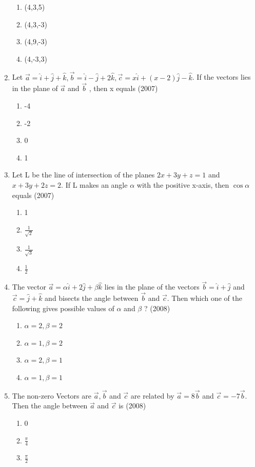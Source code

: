 \documentclass[12pt]{article}
\begin{document}
\begin{enumerate}
\begin{enumerate}
\item (4,3,5)
\item (4,3,-3)
\item (4,9,-3)
\item (4,-3,3)
\end{enumerate}
\item Let $\vec{a}=\hat{i}+\hat{j}+\hat{k},\vec{b}=\hat{i}-\hat{j}+2\hat{k},\vec{c}=x\hat{i}+(x-2)\hat{j}-\hat{k}$. If the vectors lies in the plane of $\vec{a}$ and $\vec{b}$ , then x equals (2007)
\begin{enumerate}
\item -4
\item -2
\item 0
\item 1
\end{enumerate}
\item Let L be the line of intersection of the planes $2x+3y+z=1$ and $x+3y+2z=2$. If L makes an angle $\alpha$ with the positive x-axis, then $\cos \alpha$ equals (2007)
\begin{enumerate}
\item 1
\item $\frac{1}{\sqrt{2}}$
\item $\frac{1}{\sqrt{3}}$
\item $\frac{1}{2}$
\end{enumerate}
\item The vector $\vec{a}=\alpha\hat{i}+2\hat{j}+\beta\hat{k}$ lies in the plane of the vectors $\vec{b}=\hat{i}+\hat{j}$ and $\vec{c}=\hat{j}+\hat{k}$ and bisects the angle between $\vec{b}$ and $\vec{c}$. Then which one of the following gives possible
values of $\alpha$ and $\beta$ ? (2008) 
\begin{enumerate}
\item $\alpha=2,\beta=2$ 
\item $\alpha=1,\beta=2$ 
\item $\alpha=2,\beta=1$ 
\item $\alpha=1,\beta=1$ 
\end{enumerate}
\item The non-zero Vectors are $\vec{a},\vec{b}$ and $\vec{c}$ are related by $\vec{a}=8\vec{b}$ and $\vec{c}=-7\vec{b}$. Then the angle between $\vec{a}$ and $\vec{c}$ is (2008)
\begin{enumerate}
\item 0
\item $\frac{\pi}{4}$
\item $\frac{\pi}{2}$

\end{enumerate}
\end{enumerate}
\end{document}
